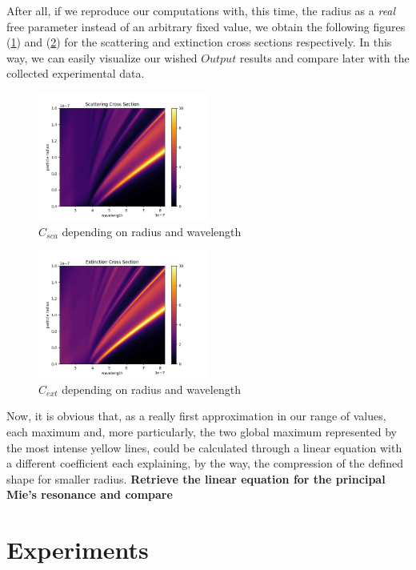 \documentclass{article}
\numberwithin{equation}{section}
\begin{document}
After all, if we reproduce our computations with, this time, the radius as a \textit{real} free parameter instead of an arbitrary fixed value, we obtain the following figures (\ref{fig:surface_sca}) and (\ref{fig:surface_ext}) for the scattering and extinction cross sections respectively. In this way, we can easily visualize our wished $Output$ results and compare later with the collected experimental data.
\begin{figure}[h]
    \centering
    \includegraphics[width=0.5\textwidth, height=0.4\textwidth]{surface_sca.png}
    \caption{$C_{sca}$ depending on radius and wavelength}
    \label{fig:surface_sca}
\end{figure}
\begin{figure}[h]
    \centering
    \includegraphics[width=0.5\textwidth, height=0.4\textwidth]{surface_ext.png}
    \caption{$C_{ext}$ depending on radius and wavelength}
    \label{fig:surface_ext}
\end{figure}
Now, it is obvious that, as a really first approximation in our range of values, each maximum and, more particularly, the two global maximum represented by the most intense yellow lines, could be calculated through a linear equation with a different coefficient each explaining, by the way, the compression of the defined shape for smaller radius. \textbf{Retrieve the linear equation for the principal Mie's resonance and compare}

\section{Experiments}
\end{document}
